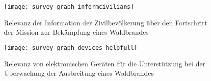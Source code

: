 \begin{figure}[H]
  \centering
  \texttt{[image: survey\_graph\_informcivilians]}
  \caption{Relevanz der Information der Zivilbevölkerung über den Fortschritt der Mission zur Bekämpfung eines Waldbrandes}
  \label{fig:survey_graph_informcivilians}
\end{figure}

\begin{figure}[H]
  \centering
  \texttt{[image: survey\_graph\_devices\_helpfull]}
  \caption{Relevanz von elektronischen Geräten für die Unterstützung bei der Überwachung der Ausbreitung eines Waldbrandes}
  \label{fig:survey_graph_devices_helpfull}
\end{figure}
